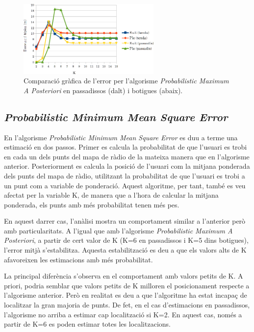 \begin{figure}[ht]
\begin{center}
\includegraphics[width=7cm]{imatges/map_desviacio.png}
\caption{Comparació gràfica de l'error per l'algorisme \textit{Probabilistic Maximum A Posteriori} en passadissos (dalt) i botigues (abaix).}
\label{fig:grafic_desviacio_MAP}
\end{center}
\end{figure}

\subsection{\textit{Probabilistic Minimum Mean Square Error}}

En l'algorisme \textit{Probabilistic Minimum Mean Square Error} es duu a terme una estimació en dos passos. Primer es calcula la probabilitat de que l'usuari es trobi en cada un dels punts del mapa de ràdio de la mateixa manera que en l'algorisme anterior. Posteriorment es calcula la posició de l'usuari com la mitjana ponderada dels punts del mapa de ràdio, utilitzant la probabilitat de que l'usuari es trobi a un punt com a variable de ponderació. Aquest algoritme, per tant, també es veu afectat per la variable K, de manera que a l'hora de calcular la mitjana ponderada, els punts amb més probabilitat tenen més pes.

En aquest darrer cas, l'anàlisi mostra un comportament similar a l'anterior però amb particularitats. A l'igual que amb l'algorisme \textit{Probabilistic Maximum A Posteriori}, a partir de cert valor de K (K=6 en passadissos i K=5 dins botigues), l'error mitjà s'estabilitza. Aquesta estabilització es deu a que els valors alts de K afavoreixen les estimacions amb més probabilitat.

La principal diferència s'observa en el comportament amb valors petits de K. A priori, podria semblar que valors petits de K milloren el posicionament respecte a l'algorisme anterior. Però  en realitat es deu a que l'algoritme ha estat incapaç de localitzar la gran majoria de punts. De fet, en el cas d'estimacions en passadissos, l'algorisme no arriba a estimar cap localització si K=2. En aquest cas, només a partir de K=6 es poden estimar totes les localitzacions.

